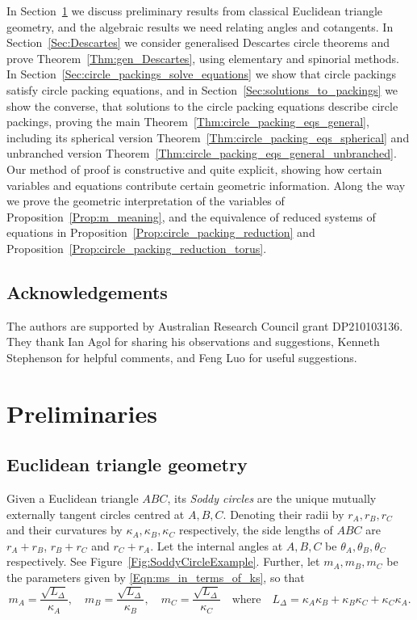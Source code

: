 \documentclass[12pt]{amsart}
\numberwithin{equation}{section}
\theoremstyle{named}
\newcommand{\refsec}[1]{Section~\ref{Sec:#1}}
\newcommand{\reffig}[1]{Figure~\ref{Fig:#1}}
\newcommand{\refeqn}[1]{\eqref{Eqn:#1}}
\newcommand{\refprop}[1]{Proposition~\ref{Prop:#1}}
\newcommand{\refthm}[1]{Theorem~\ref{Thm:#1}}
\begin{document}
In \refsec{preliminaries} we discuss preliminary results from classical Euclidean triangle geometry, and the algebraic results we need relating angles and cotangents. In \refsec{Descartes} we consider generalised Descartes circle theorems and prove \refthm{gen_Descartes}, using elementary and spinorial methods. In \refsec{circle_packings_solve_equations} we show that circle packings satisfy circle packing equations, and in \refsec{solutions_to_packings} we show the converse, that solutions to the circle packing equations describe circle packings, proving 
 the main \refthm{circle_packing_eqs_general}, including its spherical version \refthm{circle_packing_eqs_spherical} and unbranched version \refthm{circle_packing_eqs_general_unbranched}. Our method of proof is constructive and quite explicit, showing how certain variables and equations contribute certain geometric information. Along the way we prove the geometric interpretation of the variables of \refprop{m_meaning}, and the equivalence of reduced systems of equations in \refprop{circle_packing_reduction} and \refprop{circle_packing_reduction_torus}.

\subsection{Acknowledgements}

The authors are supported by Australian Research Council grant DP210103136. They thank Ian Agol for sharing his observations and suggestions, Kenneth Stephenson for helpful comments, and Feng Luo for useful suggestions.


\section{Preliminaries}
\label{Sec:preliminaries}

\subsection{Euclidean triangle geometry}
\label{Sec:Euclidean_triangles}

Given a Euclidean triangle $ABC$, its \emph{Soddy circles} are the unique mutually externally tangent circles centred at $A,B,C$. Denoting their radii by $r_A, r_B, r_C$ and their curvatures by $\kappa_A, \kappa_B, \kappa_C$ respectively, the side lengths of $ABC$ are $r_A + r_B$, $r_B + r_C$ and $r_C + r_A$. Let the internal angles at $A,B,C$ be $\theta_A, \theta_B, \theta_C$ respectively. See \reffig{SoddyCircleExample}. Further, let $m_A, m_B, m_C$ be the parameters given by \refeqn{ms_in_terms_of_ks}, so that 
\begin{equation}
\label{Eqn:mX_nice}
m_A = \frac{\sqrt{L_\Delta}}{\kappa_A}, \quad
m_B = \frac{\sqrt{L_\Delta}}{\kappa_B}, \quad
m_C = \frac{\sqrt{L_\Delta}}{\kappa_C}
\quad \text{where} \quad
L_\Delta = \kappa_A \kappa_B + \kappa_B \kappa_C + \kappa_C \kappa_A.
\end{equation}
\end{document}
